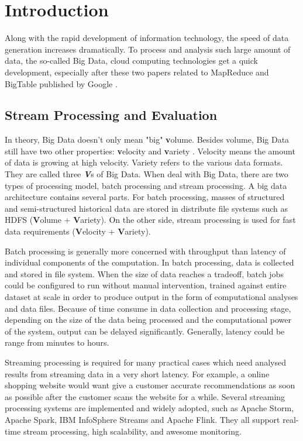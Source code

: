 \chapter{Introduction}
\label{chapter:intro}

Along with the rapid development of information technology, the speed of data generation increases dramatically. To process and analysis such large amount of data, the so-called Big Data,  cloud computing technologies get a quick development,  especially after these two papers related to MapReduce and BigTable published by Google  \cite{chang2006bigtable, dean2008mapreduce}.

\section{Stream Processing and Evaluation}
\label{section:big_data_analytics}
In theory, Big Data doesn't only mean "big" \textbf{v}olume. Besides volume, Big Data still have two other properties: \textbf{v}elocity and \textbf{v}ariety \cite{doug2001data}. Velocity means the amount of data is growing at high velocity. Variety refers to the various data formats.  They are called three \textbf{\textit{V}}s of Big Data.  When deal with Big Data, there are two types of processing model, batch processing and stream processing. A big data architecture contains several parts. For batch processing, masses of structured and semi-structured historical data are stored in distribute file systems such as HDFS (\textbf{V}olume + \textbf{V}ariety). On the other side, stream processing is used for fast data requirements (\textbf{V}elocity + \textbf{V}ariety)\cite{GameChanger}.

Batch processing is generally more concerned with throughput than latency of individual components of the computation. In batch processing, data is collected and stored in file system. When the size of data reaches a tradeoff, batch jobs could be configured to run without manual intervention, trained against entire dataset at scale in order to produce output in the form of computational analyses and data files. Because of time consume in data collection and processing stage, depending on the size of the data being processed and the computational power of the system, output can be delayed significantly. Generally, latency could be range from minutes to hours.

Streaming processing is required for many practical cases which need analysed results from streaming data in a very short latency. For example, a online shopping website would want give a customer accurate recommendations as soon as possible after the customer scans the website for a while.  Several streaming processing systems are implemented and widely adopted, such as Apache Storm, Apache Spark, IBM InfoSphere Streams and Apache Flink. They all support real-time stream processing, high scalability, and awesome monitoring. 

